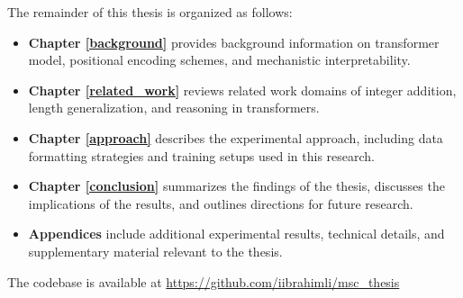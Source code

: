 The remainder of this thesis is organized as follows:

\begin{itemize}
    \item \textbf{Chapter \ref{background}} provides background information on transformer model, positional encoding schemes, and mechanistic interpretability.
    \item \textbf{Chapter \ref{related_work}} reviews related work domains of integer addition, length generalization, and reasoning in transformers.
    \item \textbf{Chapter \ref{approach}} describes the experimental approach, including data formatting strategies and training setups used in this research.
    \item \textbf{Chapter \ref{conclusion}} summarizes the findings of the thesis, discusses the implications of the results, and outlines directions for future research.
    \item \textbf{Appendices} include additional experimental results, technical details, and supplementary material relevant to the thesis.
\end{itemize}

The codebase is available at \url{https://github.com/iibrahimli/msc_thesis}